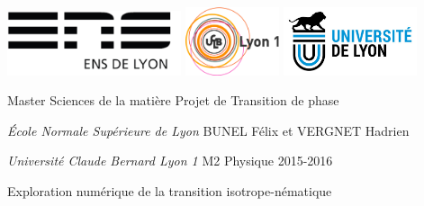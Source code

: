 \documentclass[11pt,a4paper]{article}
\author{Bunel Félix et Vergnet Hadrien}
\numberwithin{equation}{section}
\begin{document}
\begin{titlepage}
\thispagestyle{empty}
\setlength{\parindent}{0pt}

\includegraphics[height=1.9cm]{logo-ens.jpg} \hfill \includegraphics[height=2cm]{logo_lyon1.jpg} \hfill \includegraphics[height=2cm]{logo_univ_lyon.jpg}



Master Sciences de la matière
\hfill
Projet de Transition de phase 

\textit{École Normale Supérieure de Lyon}
\hfill
BUNEL Félix et VERGNET Hadrien

\textit{Université Claude Bernard Lyon 1}
\hfill
M2 Physique 2015-2016
\vspace{0.5cm}

\hrulefill
\vspace{-0.6cm}

\hrulefill


\begin{center}\bfseries
\vspace{0.3cm}
\begin{huge}
    Exploration numérique de la transition isotrope-nématique
\end{huge}
\end{center}

\hrulefill
\vspace{-0.6cm}

\hrulefill



\end{titlepage}
\end{document}
